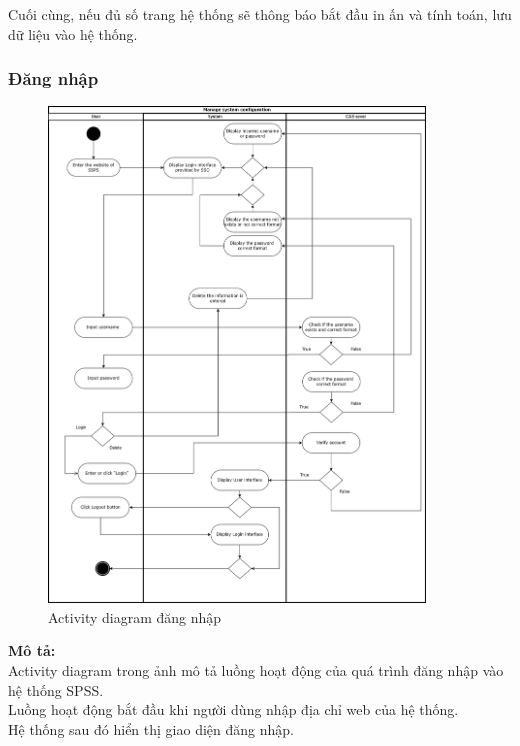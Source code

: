 \documentclass[a4paper]{article}
\begin{document}
\noindent Cuối cùng, nếu đủ số trang hệ thống sẽ thông báo bắt đầu in ấn và tính toán, lưu dữ liệu vào hệ thống.


\newpage
\subsubsection{Đăng nhập}
\begin{figure}[h!]
\begin{center}
\includegraphics[width=10cm]{picture/Activiti_diagram_login-Trang-5.drawio (1).png}
\caption{Activity diagram đăng nhập}
\end{center}
\end{figure}
\newpage
\noindent \textbf{Mô tả:}\\
\noindent Activity diagram trong ảnh mô tả luồng hoạt động của quá trình đăng nhập vào hệ thống SPSS. \\
\noindent Luồng hoạt động bắt đầu khi người dùng nhập địa chỉ web của hệ thống. \\
\noindent Hệ thống sau đó hiển thị giao diện đăng nhập.
\end{document}
